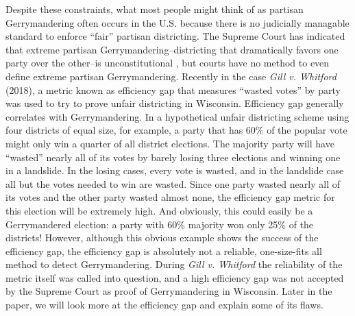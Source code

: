 \documentclass[12pt]{article}
\begin{document}
    Despite these constraints, what most people might think of as partisan Gerrymandering often occurs in the U.S. because there is no judicially managable standard to enforce ``fair'' partisan districting. The Supreme Court has indicated that extreme partisan Gerrymandering--districting that dramatically favors one party over the other--is unconstitutional \cite{GW}, but courts have no method to even define extreme partisan Gerrymandering. Recently in the case \textit{Gill v. Whitford} (2018), a metric known as efficiency gap that measures ``wasted votes'' by party was used to try to prove unfair districting in Wisconsin. Efficiency gap generally correlates with Gerrymandering. In a hypothetical unfair districting scheme using four districts of equal size, for example, a party that has 60\% of the popular vote might only win a quarter of all district elections. The majority party will have ``wasted'' nearly all of its votes by barely losing three elections and winning one in a landslide. In the losing cases, every vote is wasted, and in the landslide case all but the votes needed to win are wasted. Since one party wasted nearly all of its votes and the other party wasted almost none, the efficiency gap metric for this election will be extremely high. And obviously, this could easily be a Gerrymandered election: a party with 60\% majority won only 25\% of the districts! However, although this obvious example shows the success of the efficiency gap, the efficiency gap is absolutely not a reliable, one-size-fits all method to detect Gerrymandering. During \textit{Gill v. Whitford} the reliability of the metric itself was called into question, and a high efficiency gap was not accepted by the Supreme Court as proof of Gerrymandering in Wisconsin. Later in the paper, we will look more at the efficiency gap and explain some of its flaws.
\end{document}
